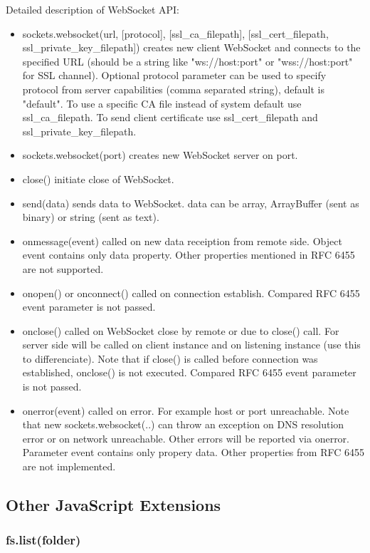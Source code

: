 Detailed description of WebSocket API:
\begin{itemize}
\item sockets.websocket(url, [protocol], [ssl\_ca\_filepath], [ssl\_cert\_filepath, 
ssl\_private\_key\_filepath]) creates new client WebSocket and connects to the 
specified URL (should be a string like "ws://host:port" or "wss://host:port" for 
SSL channel). Optional protocol parameter can be used to specify protocol from server 
capabilities (comma separated string), default is "default". To use a specific CA file 
instead of system default use ssl\_ca\_filepath. To send client certificate use  ssl\_cert\_filepath and ssl\_private\_key\_filepath.
\item sockets.websocket(port) creates new WebSocket server on port.
\item close() initiate close of WebSocket.
\item send(data) sends data to WebSocket. data can be array, ArrayBuffer (sent as binary) or string (sent as text).
\item onmessage(event) called on new data receiption from remote side. Object event contains only data property. Other properties mentioned in RFC 6455 are not supported.
\item onopen() or onconnect() called on connection establish. Compared RFC 6455 event parameter is not passed.
\item onclose() called on WebSocket close by remote or due to close() call. For server side will be called on client instance and on listening instance (use this to differenciate). Note that if close() is called before connection was established, onclose() is not executed. Compared RFC 6455 event parameter is not passed.
\item onerror(event) called on error. For example host or port unreachable. Note that new sockets.websocket(..) can throw an exception on DNS resolution error or on network unreachable. Other errors will be reported via onerror. Parameter event contains only propery data. Other properties from RFC 6455 are not implemented.
\end{itemize}

\subsection{Other JavaScript Extensions}

\subsubsection{fs.list(folder)}


